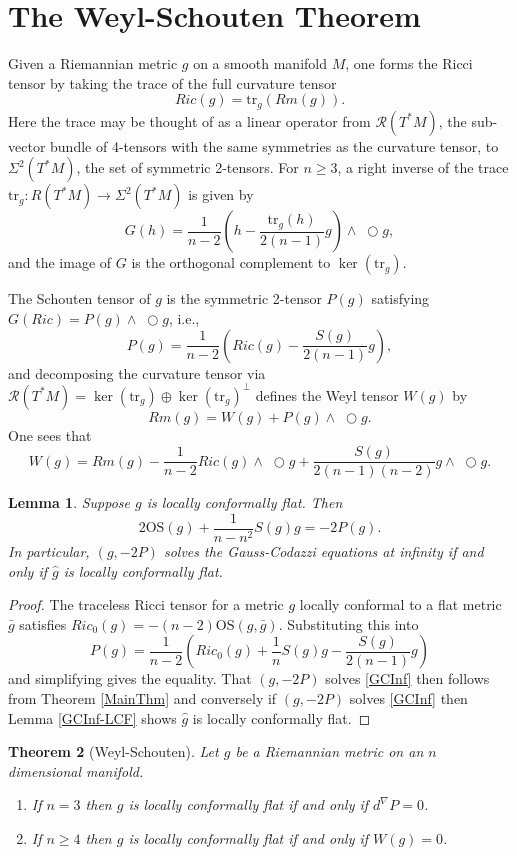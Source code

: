 \documentclass{amsart}
\newcommand{\tr}{\mathrm{tr}}
\newcommand{\wtimes}{\wedge \!\!\!\!\!\!\!\!\;\bigcirc}
\newtheorem{thm}{Theorem}[section]
\newtheorem{lem}[thm]{Lemma}
\begin{document}
\section{The Weyl-Schouten Theorem}

Given a Riemannian metric $g$ on a smooth manifold $M$, one forms the Ricci tensor by taking the trace of the full curvature tensor 
\[
Ric(g) = \tr_g(Rm(g)).
\]
Here the trace may be thought of as a linear operator from $\mathcal{R}(T^*M)$, the sub-vector bundle of 4-tensors with the same symmetries as the curvature tensor, to $\Sigma^2(T^*M)$, the set of symmetric 2-tensors.
For $n\geq 3$, a right inverse of the trace $\tr_g: R(T^*M) \to \Sigma^2(T^*M)$ is given by 
\[
G(h) = \frac{1}{n-2}\left( h - \frac{\tr_g(h)}{2(n-1)} g \right) \wtimes g,
\]
and the image of $G$ is the orthogonal complement to $\ker(\tr_g)$.

The Schouten tensor of $g$ is the symmetric 2-tensor $P(g)$ satisfying $G(Ric) = P(g) \wtimes g$, i.e., 
\[
P(g) = \frac{1}{n-2}\left( Ric(g) - \frac{S(g)}{2(n-1)} g \right),
\]
and decomposing the curvature tensor via $\mathcal{R}(T^*M) = \ker(\tr_g) \oplus \ker(\tr_g)^\perp$ defines the Weyl tensor $W(g)$ by 
\[
Rm(g) = W(g) + P(g)\wtimes g.
\]
One sees that 
\[
W(g) = Rm(g) - \frac{1}{n-2}Ric(g) \wtimes g + \frac{S(g)}{2(n-1)(n-2)} g \wtimes g.
\]

\begin{lem}
\label{SchoutenSolves}
Suppose $g$ is locally conformally flat. Then 
\[
2\mathrm{OS}(g) + \frac{1}{n-n^2}S(g)g = -2 P(g). 
\]
In particular, $(g,-2P)$ solves the Gauss-Codazzi equations at infinity if and only if $\hat{g}$ is locally conformally flat. 
\end{lem}

\begin{proof}
The traceless Ricci tensor for a metric $g$ locally conformal to a flat metric $\bar{g}$ satisfies $Ric_0(g) = -(n-2)\mathrm{OS}(g,\bar{g})$.
Substituting this into
\[
P(g) = \frac{1}{n-2}\left( Ric_0(g) + \frac{1}{n}S(g)g - \frac{S(g)}{2(n-1)} g \right)
\]
and simplifying gives the equality.
That $(g,-2P)$ solves \ref{GCInf} then follows from Theorem \ref{MainThm} and conversely if $(g,-2P)$ solves \ref{GCInf} then Lemma \ref{GCInf-LCF} shows $\hat{g}$ is locally conformally flat. 
\end{proof}

\begin{thm}[Weyl-Schouten]
Let $g$ be a Riemannian metric on an $n$ dimensional manifold.

\begin{enumerate}
\item If $n = 3$ then $g$ is locally conformally flat if and only if $d^\nabla P = 0$.

\item If $n \geq 4$ then $g$ is locally conformally flat if and only if $W(g) = 0$.

\end{enumerate}
\end{thm}
\end{document}
